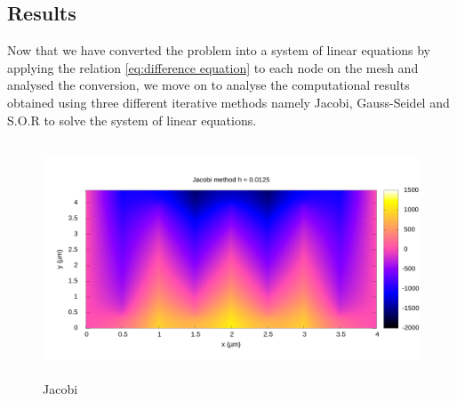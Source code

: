 \subsection{Results}
Now that we have converted the problem into a system of linear equations by applying the relation \ref{eq:difference equation} to each node on the mesh and analysed the conversion, we move on to analyse the computational results obtained using three different iterative methods namely Jacobi, Gauss-Seidel and S.O.R to solve the system of linear equations.


\begin{figure}[ht]
    \centering
    \includegraphics[height= 70mm]{content/graphs/Jacobi_0125_map.png}
    \caption{Jacobi}
    \label{fig1}
\end{figure}%

